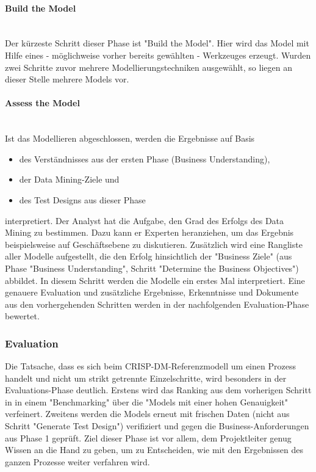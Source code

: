 \paragraph{Build the Model}\mbox{} \\
Der kürzeste Schritt dieser Phase ist "Build the Model". Hier wird das Model mit Hilfe eines - möglichweise vorher bereits gewählten - Werkzeuges erzeugt. Wurden zwei Schritte zuvor mehrere Modellierungstechniken ausgewählt, so liegen an dieser Stelle mehrere Models vor.

\paragraph{Assess the Model}\mbox{} \\
Ist das Modellieren abgeschlossen, werden die Ergebnisse auf Basis 
\begin{itemize}
\item des Verständnisses aus der ersten Phase (Business Understanding),
\item der Data Mining-Ziele und
\item des Test Designs aus dieser Phase
\end{itemize}
interpretiert. Der Analyst hat die Aufgabe, den Grad des Erfolgs des Data Mining zu bestimmen. Dazu kann er Experten heranziehen, um das Ergebnis beispielsweise auf Geschäftsebene zu diskutieren. Zusätzlich wird eine Rangliste aller Modelle aufgestellt, die den Erfolg hinsichtlich der "Business Ziele" (aus Phase "Business Understanding", Schritt "Determine the Business Objectives") abbildet. \newline
In diesem Schritt werden die Modelle ein erstes Mal interpretiert.  Eine genauere Evaluation und zusätzliche Ergebnisse, Erkenntnisse und Dokumente aus den vorhergehenden Schritten werden in der nachfolgenden Evaluation-Phase bewertet.\citep[S.25]{chapman_crisp-dm_2000}


\subsubsection{Evaluation}
Die Tatsache, dass es sich beim CRISP-DM-Referenzmodell um einen Prozess handelt und nicht um strikt getrennte Einzelschritte, wird besonders in der Evaluations-Phase deutlich. Erstens wird das Ranking aus dem vorherigen Schritt in in einem "Benchmarking" über die "Models mit einer hohen Genauigkeit"\citep[S.~73; eigene Übersetzung]{swamynathan_mastering_2017} verfeinert. Zweitens werden die Models erneut mit frischen Daten (nicht aus Schritt "Generate Test Design") verifiziert und gegen die Business-Anforderungen aus Phase 1 geprüft.\citep[S.~73]{swamynathan_mastering_2017} Ziel dieser Phase ist vor allem, dem Projektleiter genug Wissen an die Hand zu geben, um zu Entscheiden, wie mit den Ergebnissen des ganzen Prozesse weiter verfahren wird. 

